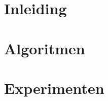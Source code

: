 \documentclass[12pt,a4paper]{article}
\begin{document}

\tableofcontents
\section{Inleiding}


\section{Algoritmen}



\section{Experimenten}






\end{document}
